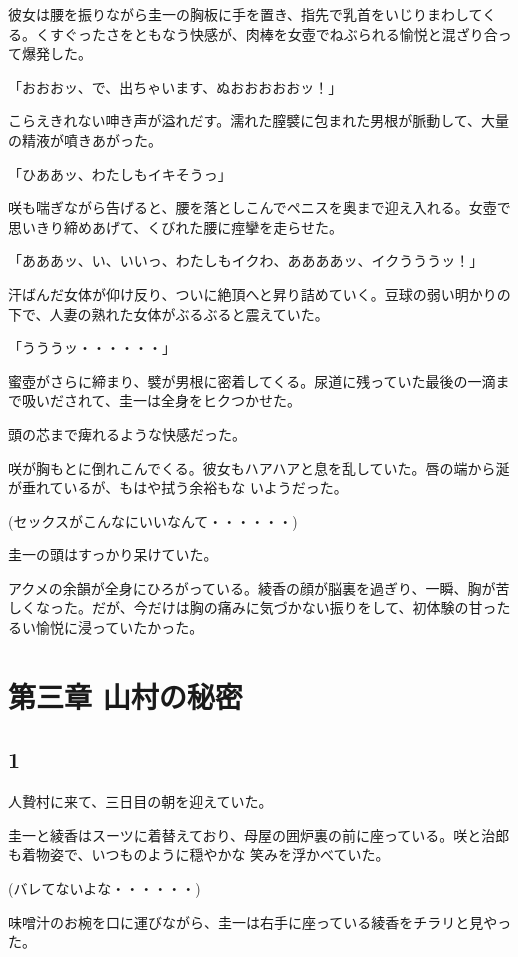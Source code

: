﻿\documentclass[book,tate]{jlreq}
\begin{document}
彼女は腰を振りながら圭一の胸板に手を置き、指先で乳首をいじりまわしてくる。くすぐったさをともなう快感が、肉棒を女壺でねぶられる愉悦と混ざり合って爆発した。

「おおおッ、で、出ちゃいます、ぬおおおおおッ！」

こらえきれない呻き声が溢れだす。濡れた膣襞に包まれた男根が脈動して、大量の精液が噴きあがった。

「ひああッ、わたしもイキそうっ」

咲も喘ぎながら告げると、腰を落としこんでペニスを奥まで迎え入れる。女壺で思いきり締めあげて、くびれた腰に痙攣を走らせた。

「あああッ、い、いいっ、わたしもイクわ、ああああッ、イクうううッ！」

汗ばんだ女体が仰け反り、ついに絶頂へと昇り詰めていく。豆球の弱い明かりの下で、人妻の熟れた女体がぶるぶると震えていた。

「うううッ・・・・・・」

蜜壺がさらに締まり、襞が男根に密着してくる。尿道に残っていた最後の一滴まで吸いだされて、圭一は全身をヒクつかせた。

頭の芯まで痺れるような快感だった。

咲が胸もとに倒れこんでくる。彼女もハアハアと息を乱していた。唇の端から涎が垂れているが、もはや拭う余裕もな いようだった。

(セックスがこんなにいいなんて・・・・・・)

圭一の頭はすっかり呆けていた。

アクメの余韻が全身にひろがっている。綾香の顔が脳裏を過ぎり、一瞬、胸が苦しくなった。だが、今だけは胸の痛みに気づかない振りをして、初体験の甘ったるい愉悦に浸っていたかった。

\chapter{第三章 山村の秘密}

\section*{1}

人贄村に来て、三日目の朝を迎えていた。

圭一と綾香はスーツに着替えており、母屋の囲炉裏の前に座っている。咲と治郎も着物姿で、いつものように穏やかな 笑みを浮かべていた。

(バレてないよな・・・・・・)

味噌汁のお椀を口に運びながら、圭一は右手に座っている綾香をチラリと見やった。
\end{document}
